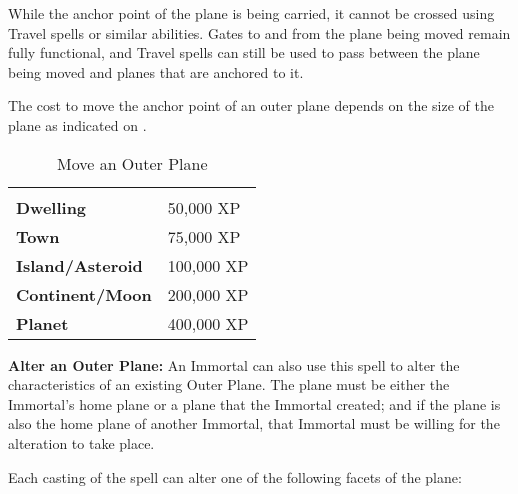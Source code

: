 \begin{multicols*}{2}
While the anchor point of the plane is being carried, it cannot be crossed using Travel spells or similar abilities. Gates to and from the plane being moved remain fully functional, and Travel spells can still be used to pass between the plane being moved and planes that are anchored to it.

The cost to move the anchor point of an outer plane depends on the size of the plane as indicated on .

\begin {table}[H]
  \caption{Move an Outer Plane}\label{tab:Move an Outer Plane}
  \begin{tabularx}{\columnwidth}{>{\bfseries}YY}
	 & \\
	Dwelling & 50,000 XP\\
	Town & 75,000 XP\\
	Island/Asteroid & 100,000 XP\\
	Continent/Moon & 200,000 XP\\
	Planet & 400,000 XP
  \end {tabularx}
\end {table}

\textbf{Alter an Outer Plane:} An Immortal can also use this spell to alter the characteristics of an existing Outer Plane.
The plane must be either the Immortal’s home plane or a plane that the Immortal created; and if the plane is also the home plane of another Immortal, that Immortal must be willing for the alteration to take place.

Each casting of the spell can alter one of the following facets of the plane:


\end{multicols*}
